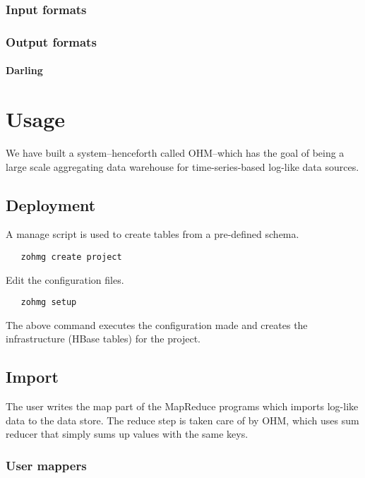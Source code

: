 \documentclass[a4paper,10pt]{book}
\begin{document}
\subsection{Input formats}

\subsection{Output formats}

\subsubsection{Darling}



\chapter{Usage}

We have built a system--henceforth called OHM--which has the goal of being
a large scale aggregating data warehouse for time-series-based log-like
data sources.



\section{Deployment}

A manage script is used to create tables from a pre-defined schema.

\begin{verbatim}
   zohmg create project
\end{verbatim}

\noindent Edit the configuration files.

\begin{verbatim}
   zohmg setup
\end{verbatim}

\noindent The above command executes the configuration made and creates the
infrastructure (HBase tables) for the project.


\section{Import}

The user writes the map part of the MapReduce programs which imports
log-like data to the data store. The reduce step is taken care of by OHM,
which uses sum reducer that simply sums up values with the same keys.


\subsection{User mappers}
\end{document}
